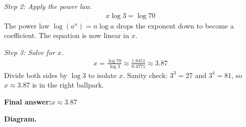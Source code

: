 \documentclass[11pt]{article}
\begin{document}
\textit{Step 2: Apply the power law.}
\[\begin{gathered}
x\log 3 = \log 70
\end{gathered}\]
The power law \( \log(a^n) = n\log a \) drops the exponent down to become a coefficient. The equation is now linear in \( x \).

\textit{Step 3: Solve for \( x \).}
\[\begin{gathered}
x = \frac{\log 70}{\log 3} \approx \frac{1.8451}{0.4771} \approx 3.87
\end{gathered}\]
Divide both sides by \( \log 3 \) to isolate \( x \). Sanity check: \( 3^3 = 27 \) and \( 3^4 = 81 \), so \( x \approx 3.87 \) is in the right ballpark.

\begin{answerbox}
\textbf{Final answer:}\quad \(\displaystyle  x \approx 3.87 \)
\end{answerbox}
\textbf{Diagram.}
\end{document}
